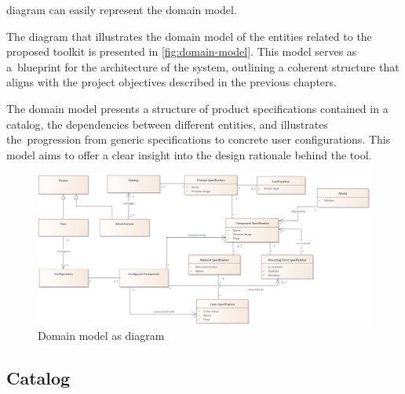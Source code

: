  diagram can easily represent the domain model.~\cite{Wlaschin2018}

The  diagram that illustrates the domain model of the entities related to the proposed toolkit is presented in \autoref{fig:domain-model}. This model serves as a~blueprint for the architecture of the system, outlining a coherent structure that aligns with the project objectives described in the previous chapters. 

The domain model presents a structure of product specifications contained in a catalog, the dependencies between different entities, and illustrates the~progression from generic specifications to concrete user configurations. This model aims to offer a clear insight into the design rationale behind the tool.

\begin{landscape}
\begin{figure}
\centering
\includegraphics[width=\linewidth]{images/uml_domainmodel.png}
\caption{Domain model as  diagram}
\label{fig:domain-model}
\end{figure}
\end{landscape}

\subsection{Catalog}

